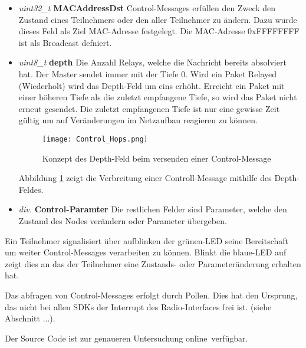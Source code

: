 \begin{itemize}
	\item \textit{uint32\_t} \textbf{MACAddressDst} Control-Messages erfüllen den Zweck den Zustand eines Teilnehmers oder den aller Teilnehmer zu ändern. Dazu wurde dieses Feld als Ziel MAC-Adresse festgelegt. Die MAC-Adresse 0xFFFFFFFF ist als Broadcast defniert. \\
	
	\item \textit{uint8\_t} \textbf{depth} Die Anzahl Relays, welche die Nachricht bereits absolviert hat. Der Master sendet immer mit der Tiefe 0. Wird ein Paket Relayed (Wiederholt) wird das Depth-Feld um eins erhöht. Erreicht ein Paket mit einer höheren Tiefe als die zuletzt empfangene Tiefe, so wird das Paket nicht erneut gesendet. Die zuletzt empfangenen Tiefe ist nur eine gewisse Zeit gültig um auf Veränderungen im Netzaufbau reagieren zu können. \\
	
	
	\begin{figure}[H]
		\centering
		\texttt{[image: Control\_Hops.png]}
		\caption{Konzept des Depth-Feld beim versenden einer Control-Message}\label{fig:ControlMessagesHops}
	\end{figure}

	Abbildung \ref{fig:ControlMessagesHops} zeigt die Verbreitung einer Controll-Message mithilfe des Depth-Feldes. \\
	
	\item \textit{div.} \textbf{Control-Paramter} Die restlichen Felder sind Parameter, welche den Zustand des Nodes verändern oder Parameter übergeben. 
\end{itemize}


Ein Teilnehmer signalisiert über aufblinken der grünen-LED seine Bereitschaft um weiter Control-Messages verarbeiten zu können. Blinkt die blaue-LED auf zeigt dies an das der Teilnehmer eine Zustands- oder Parameteränderung erhalten hat. 

Das abfragen von Control-Messages erfolgt durch Pollen. Dies hat den Ursprung, das nicht bei allen SDKs der Interrupt des Radio-Interfaces frei ist. (siehe Abschnitt ...). 


Der Source Code ist zur genaueren Untersuchung online\footnotemark\ verfügbar. 





